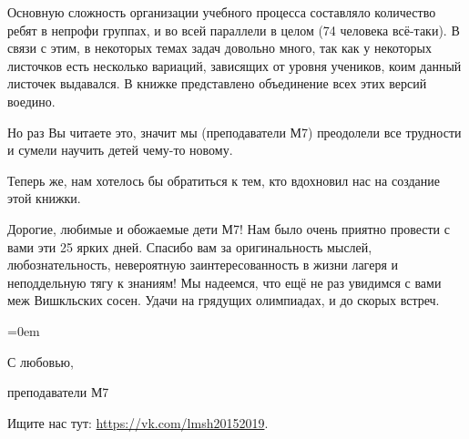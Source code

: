 \documentclass[12pt]{book}
\begin{document}
Основную сложность организации учебного процесса составляло количество ребят в непрофи группах, и во всей параллели в целом (74 человека всё-таки). В связи с этим, в некоторых темах задач довольно много, так  как у некоторых листочков есть несколько вариаций, зависящих от уровня учеников, коим данный листочек выдавался. В книжке представлено объединение всех этих версий воедино.

Но раз Вы читаете это, значит мы (преподаватели М7) преодолели все трудности и сумели научить детей чему-то новому.

Теперь же, нам хотелось бы обратиться к тем, кто вдохновил нас на создание этой книжки.

Дорогие, любимые и обожаемые дети М7! Нам было очень приятно провести с вами эти 25 ярких дней. Спасибо вам за оригинальность мыслей, любознательность, невероятную заинтересованность в жизни лагеря и неподдельную тягу к знаниям! Мы надеемся, что ещё не раз увидимся с вами меж Вишкльских сосен. Удачи на грядущих олимпиадах, и до скорых встреч.

\parindent=0em


\begin{flushright}
\vspace{1cm}

С любовью,

преподаватели М7

\vfill

Ищите нас тут: \url{https://vk.com/lmsh20152019}.
\end{flushright}

\tableofcontents\newpage

\renewcommand{\@oddhead}{\vbox{\hbox to \textwidth{{\raisebox{1.8mm}{\strut{\small\bfseries Кировская ЛМШ 2016, 7 класс}}\hfil\raisebox{1.8mm}{\strut\bfseries\thepage}}}\hrule}}
\renewcommand{\@evenhead}{\vbox{\hbox to \textwidth{{\raisebox{1.8mm}{\strut\bfseries\thepage}\hfil\raisebox{1.8mm}{\strut{\small\bfseries Кировская ЛМШ 2016, 7 класс}}}}\hrule}}
\end{document}
